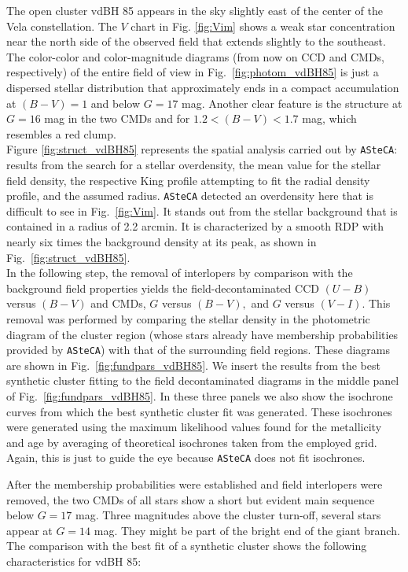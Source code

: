 \documentclass[draft]{aa}
\begin{document}
The open cluster vdBH 85 appears in the sky slightly east of the center of the
Vela constellation. The $V$ chart in Fig. \ref{fig:Vim} shows a weak star
concentration near the north side of the observed field that extends slightly
to the southeast. 
%
The color-color and color-magnitude diagrams (from now on CCD and CMDs,
respectively) of the entire field of view in Fig.~\ref{fig:photom_vdBH85} is
just a dispersed stellar distribution that approximately ends in a compact accumulation at
$(B-V)=1$ and below $G=17$ mag. Another clear feature is the
structure at $G=16$ mag in the two CMDs and for $1.2<(B-V)<1.7$ mag, which resembles
a red clump.\\

Figure \ref{fig:struct_vdBH85} represents the spatial analysis carried
out by \texttt{ASteCA}: results from the search for a stellar
overdensity, the mean value for the stellar field density, the respective King
profile attempting to fit the radial density profile, and the assumed radius.
%
\texttt{ASteCA} detected an overdensity here that is difficult to see in
Fig.~\ref{fig:Vim}. It stands out from the stellar background that is contained
in a radius of 2.2 arcmin. It is characterized by a smooth RDP 
with nearly six times the background density at its peak, 
as shown in Fig.~\ref{fig:struct_vdBH85}.\\

In the following step, the removal of interlopers by comparison with the
background field properties yields the field-decontaminated CCD
$(U-B)$ versus $(B-V)$ and CMDs, $G$ versus $(B-V),$ and $G$ versus $(V-I)$.
This removal was performed by comparing the stellar density in the photometric
diagram of the cluster region (whose stars already have membership
probabilities provided by \texttt{ASteCA}) with that of the surrounding field
regions. These diagrams are shown in Fig.~\ref{fig:fundpars_vdBH85}.
%
We insert the results from the best synthetic cluster fitting to the field
decontaminated diagrams in the middle panel of Fig.~\ref{fig:fundpars_vdBH85}.
In these three panels we also show the isochrone curves from which the best
synthetic cluster fit was generated. These isochrones were generated
using the maximum likelihood values found for the metallicity and age by
averaging of theoretical isochrones taken from the employed grid.
Again, this is just to guide the eye because \texttt{ASteCA} does not fit
isochrones.

After the membership probabilities were established and field
interlopers were removed, the two CMDs of all stars show a short but evident main
sequence below $G=17$ mag.
Three magnitudes above the cluster turn-off, several stars appear at $G=14$ mag. They might be part of the bright end of the giant branch. The comparison
with the best fit of a synthetic cluster shows the following
characteristics for vdBH 85:
\end{document}
